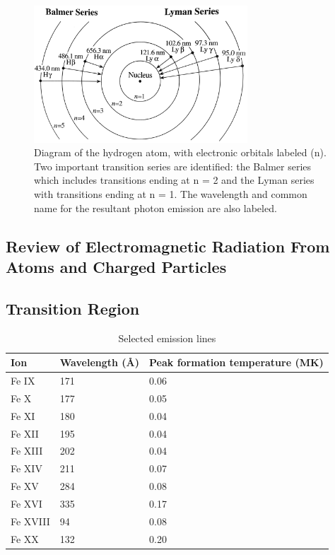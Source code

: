 \begin{figure}[!h]
    \begin{center}
	    \includegraphics[width=80mm]{Images/HydrogenTransitions.png}
    \end{center}
    \caption[Atomic Transitions for Balmer and Lyman Series]{
        Diagram of the hydrogen atom, with electronic orbitals labeled (n). Two important transition series are 
        identified: the Balmer series which includes transitions ending at n = 2 and the Lyman series with 
        transitions ending at n = 1. The wavelength and common name for the resultant photon emission are also labeled. 
    }
    \label{fig:balmerandlyman}
\end{figure}

\subsection{Review of Electromagnetic Radiation From Atoms and Charged Particles}

\subsection{Transition Region}

\begin{table}[!h]
    \caption[Selected emission lines and temperatures]{
    Selected emission lines
    }
    \begin{center}
    \begin{tabular}{|l|l|p{2cm}|} \hline
	Ion & Wavelength (\AA) & Peak formation temperature (MK) \\ \hline \hline
	Fe IX & 171 & 0.06 \\ \hline
	Fe X & 177 & 0.05  \\ \hline
	Fe XI & 180 & 0.04 \\ \hline
	Fe XII & 195 & 0.04 \\ \hline
	Fe XIII & 202 & 0.04 \\ \hline
	Fe XIV & 211 & 0.07 \\ \hline
	Fe XV & 284 & 0.08 \\ \hline
	Fe XVI & 335 & 0.17 \\ \hline
	Fe XVIII & 94 & 0.08 \\ \hline
	Fe XX & 132 & 0.20 \\ \hline
	\end{tabular}
    \\ \rule{0mm}{5mm}
    \end{center}
    \label{tab:emissionlines}
\end{table}

